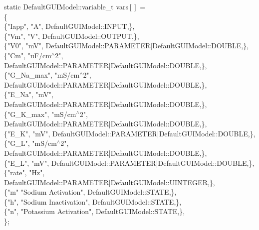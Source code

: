 \begin{maxipage}
\begin{example}
static DefaultGUIModel::variable\_t vars$\left[\right]$ =\\
\{\\
\hspace{.5cm}\{"Iapp", "A", DefaultGUIModel::INPUT,\},\\
\hspace{.5cm}\{"Vm", "V", DefaultGUIModel::OUTPUT,\},\\
\hspace{.5cm}\{"V0", "mV", DefaultGUIModel::PARAMETER|DefaultGUIModel::DOUBLE,\},\\
\hspace{.5cm}\{"Cm", "uF/cm$^{\wedge}$2", DefaultGUIModel::PARAMETER|DefaultGUIModel::DOUBLE,\},\\
\hspace{.5cm}\{"G\_Na\_max", "mS/cm$^{\wedge}$2", DefaultGUIModel::PARAMETER|DefaultGUIModel::DOUBLE,\},\\
\hspace{.5cm}\{"E\_Na", "mV", DefaultGUIModel::PARAMETER|DefaultGUIModel::DOUBLE,\},\\
\hspace{.5cm}\{"G\_K\_max", "mS/cm$^{\wedge}$2", DefaultGUIModel::PARAMETER|DefaultGUIModel::DOUBLE,\},\\
\hspace{.5cm}\{"E\_K", "mV", DefaultGUIModel::PARAMETER|DefaultGUIModel::DOUBLE,\},\\
\hspace{.5cm}\{"G\_L", "mS/cm$^{\wedge}$2", DefaultGUIModel::PARAMETER|DefaultGUIModel::DOUBLE,\},\\
\hspace{.5cm}\{"E\_L", "mV", DefaultGUIModel::PARAMETER|DefaultGUIModel::DOUBLE,\},\\
\hspace{.5cm}\{"rate", "Hz",  DefaultGUIModel::PARAMETER|DefaultGUIModel::UINTEGER,\},\\
\hspace{.5cm}\{"m" "Sodium Activation", DefaultGUIModel::STATE,\},\\
\hspace{.5cm}\{"h", "Sodium Inactivation", DefaultGUIModel::STATE,\},\\
\hspace{.5cm}\{"n", "Potassium Activation", DefaultGUIModel::STATE,\},\\
\};
\end{example}
\end{maxipage}

